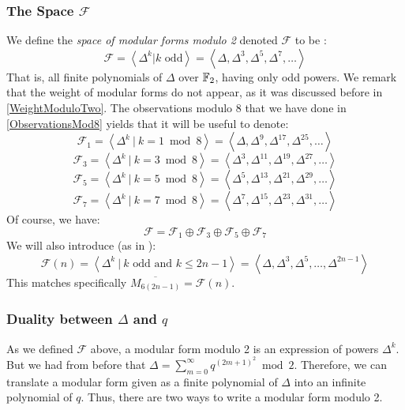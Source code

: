 \subsubsection{The Space $\mathcal{F}$}
\label{ModularFormsModTwo}
We define the \textit{space of modular forms modulo 2} denoted $\mathcal{F} $ to be \cite[2.1]{OrdreNilpotenceOperateurHecke}:
$$
\mathcal{F}
= \left\langle \Delta^k | k \text{ odd} \right\rangle
= \left\langle \Delta, \Delta^3, \Delta^5, \Delta^7, \dots \right\rangle 
$$
That is, all finite polynomials of $\Delta$ over $\mathbb{F}_2$, having only odd powers.
We remark that the weight of modular forms do not appear, as it was discussed before in \ref{WeightModuloTwo}.
The observations modulo 8 that we have done in \ref{ObservationsMod8} yields that it will be useful to denote:
$$
\mathcal{F}_1
= \left\langle \Delta^k \ | \ k = 1 \bmod 8 \right\rangle
= \left\langle \Delta, \Delta^9, \Delta^{17}, \Delta^{25}, \dots \right\rangle
$$
$$
\mathcal{F}_3
= \left\langle \Delta^k \ | \ k = 3 \bmod 8 \right\rangle
= \left\langle \Delta^3, \Delta^{11}, \Delta^{19}, \Delta^{27}, \dots \right\rangle
$$
$$
\mathcal{F}_5
= \left\langle \Delta^k \ | \ k = 5 \bmod 8 \right\rangle
= \left\langle \Delta^5, \Delta^{13}, \Delta^{21}, \Delta^{29}, \dots \right\rangle
$$
$$
\mathcal{F}_7
= \left\langle \Delta^k \ | \ k = 7 \bmod 8 \right\rangle
= \left\langle \Delta^7, \Delta^{15}, \Delta^{23}, \Delta^{31}, \dots \right\rangle
$$
Of course, we have:
$$
\mathcal{F} = \mathcal{F}_1 \oplus \mathcal{F}_3 \oplus \mathcal{F}_5 \oplus \mathcal{F}_7
$$
We will also introduce (as in \cite[2.]{StructureAlgebreHecke}):
$$
\mathcal{F}(n)
= \left\langle \Delta^k \ | \ k \text{ odd} \text{ and } k \leq 2n-1 \right\rangle
= \left\langle \Delta, \Delta^3, \Delta^5, \dots, \Delta^{2n-1} \right\rangle
$$
This matches specifically $\overline{M_{6(2n-1)}} = \mathcal{F}(n)$.

\subsubsection{Duality between $\Delta$ and $q$}
As we defined $\mathcal{F}$ above, a modular form modulo 2 is an expression of powers $\Delta^k$.
But we had from before that $\Delta = \sum_{m=0}^{\infty} q^{(2m+1)^2} \bmod 2$.
Therefore, we can translate a modular form given as a finite polynomial of $\Delta$ into an infinite polynomial of $q$.
Thus, there are two ways to write a modular form modulo 2.

